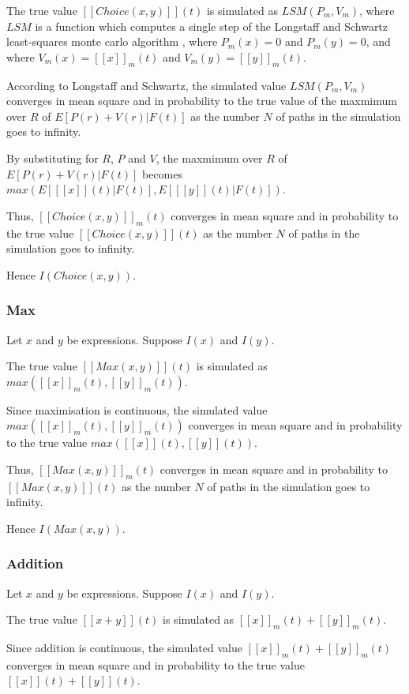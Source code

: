 \documentclass[a4paper,11pt]{article}
\newcommand{\sembrack}[1]{[\![#1]\!]}
\begin{document}
The true value $\sembrack{Choice(x,y)}(t)$ is simulated as $LSM(P_m, V_m)$, where $LSM$ is a function which computes a single step of the Longstaff and Schwartz least-squares monte carlo algorithm \cite{Longstaff}, where $P_m(x)=0$ and $P_m(y)=0$, and where $V_m(x)=\sembrack{x}_m(t)$ and $V_m(y)=\sembrack{y}_m(t)$.

According to Longstaff and Schwartz, the simulated value $LSM(P_m, V_m)$ converges in mean square and in probability to the true value of the maxmimum over $R$ of $E[P(r) + V(r)| F(t)]$ as the number $N$ of paths in the simulation goes to infinity.

By substituting for $R$, $P$ and $V$, the maxmimum over $R$ of $E[P(r) + V(r)| F(t)]$ becomes $max (E[ \sembrack{x}(t) | F(t) ], E[ \sembrack{y}(t) | F(t) ])$.

Thus, $\sembrack{Choice(x,y)}_m(t)$ converges in mean square and in probability to the true value $\sembrack{Choice(x,y)}(t)$ as the number $N$ of paths in the simulation goes to infinity.

Hence $I(Choice(x, y))$.

\subsubsection{Max}
Let $x$ and $y$ be expressions. Suppose $I(x)$ and $I(y)$.

The true value $\sembrack{Max(x,y)}(t)$ is simulated as $ max(\sembrack{x}_m(t),  \sembrack{y}_m(t)) $.

Since maximisation is continuous, the simulated value $max(\sembrack{x}_m(t), \sembrack{y}_m(t))$ converges in mean square and in probability to the true value $max(\sembrack{x}(t),  \sembrack{y}(t))$.

Thus, $\sembrack{Max(x,y)}_m(t)$ converges in mean square and in probability to $\sembrack{Max(x,y)}(t)$ as the number $N$ of paths in the simulation goes to infinity.
  
Hence $I(Max(x, y))$.

\subsubsection{Addition}
Let $x$ and $y$ be expressions. Suppose $I(x)$ and $I(y)$.

The true value $\sembrack{x + y}(t)$ is simulated as $ \sembrack{x}_m(t) + \sembrack{y}_m(t) $.

Since addition is continuous, the simulated value $\sembrack{x}_m(t) + \sembrack{y}_m(t)$ converges in mean square and in probability to the true value $\sembrack{x}(t) + \sembrack{y}(t)$.
\end{document}
